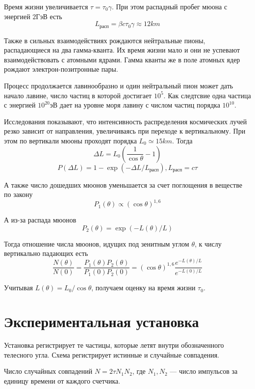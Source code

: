 \documentclass[a4paper,12pt]{article} %
\begin{document}
\noindent Время жизни увеличивается $\tau = \tau_0 \gamma$. При этом распадный пробег мюона с энергией $2$ГэВ есть 
	$$L_{\text{расп}} = \beta c \tau_0 \gamma \approx 12km$$
	
\noindent Также в сильных взаимодействиях рождаются нейтральные пионы, распадающиеся на два гамма-кванта. Их время жизни мало и они не успевают взаимодействовать с атомными ядрами. Гамма кванты же в поле атомных ядер рождают электрон-позитронные пары.
	
\medskip	
	
\noindent Процесс продолжается лавинообразно и один нейтральный пион может дать начало лавине, число частиц в которой достигает $10^5$.  Как следтсвие одна частица с энергией $10^{20}$эВ дает на уровне моря лавину с числом частиц порядка $10^{10}.$
	
\noindent Исследования показывают, что интенсивность распределения космических лучей резко зависит от направления, увеличиваясь при переходе к вертикальному. При этом по вертикали мюоны проходят порядка $L_0 \simeq 15km$. Тогда 
	$$\Delta L = L_0(\frac1{\cos \theta} - 1)$$
	$$P(\Delta L) = 1 - \exp(-\Delta L / L_\text{расп}), L_\text{расп} = c\tau$$
	
\noindent А также число дошедших мюонов уменьшается за счет поглощения в веществе по закону
	$$P_1(\theta) \propto (\cos\theta)^{1,6}$$
	
\noindent А из-за распада мюонов
	$$P_2(\theta) = \exp(-L(\theta)/L)$$
	
\noindent Тогда отношение числа мюонов, идущих под зенитным углом $\theta$, к числу вертикально падающих есть
	$$\frac{N(\theta)}{N(0)} =  \frac{P_1(\theta)P_2(\theta)}{P_1(0)P_2(0)} = (\cos\theta)^{1,6} \frac{e^{-L(\theta)/L}}{e^{-L(0)/L}}$$
	
\noindent Учитывая $L(\theta) = L_0 / \cos\theta$, получаем оценку на время жизни $\tau_0$.
		
	
	\section{Экспериментальная установка}
	
	
	
\noindent Установка регистрирует те частицы, которые летят внутри обозначенного телесного угла. Схема регистрирует истинные и случайные совпадения.
	
\medskip	
	
\noindent Число случайных совпадений $N = 2\tau N_1 N_2$, где $N_1, N_2$ --- число импульсов за единицу времени от каждого счетчика.
\end{document}
